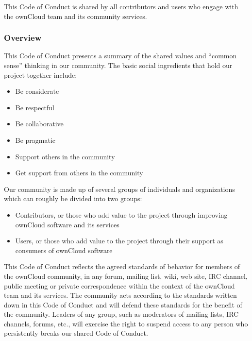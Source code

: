 \documentclass[letterpaper,10pt,english]{sphinxmanual}
\begin{document}
This Code of Conduct is shared by all contributors and users who engage with the ownCloud team and its community services.


\subsubsection{Overview}
\label{general/code-of-conduct:overview}
This Code of Conduct presents a summary of the shared values and “common sense” thinking in our community. The basic social ingredients that hold our project together include:
\begin{itemize}
\item {} 
Be considerate

\item {} 
Be respectful

\item {} 
Be collaborative

\item {} 
Be pragmatic

\item {} 
Support others in the community

\item {} 
Get support from others in the community

\end{itemize}

Our community is made up of several groups of individuals and organizations which can roughly be divided into two groups:
\begin{itemize}
\item {} 
Contributors, or those who add value to the project through improving ownCloud software and its services

\item {} 
Users, or those who add value to the project through their support as consumers of ownCloud software

\end{itemize}

This Code of Conduct reflects the agreed standards of behavior for members of the ownCloud community, in any forum, mailing list, wiki, web site, IRC channel, public meeting or private correspondence within the context of the ownCloud team and its services. The community acts according to the standards written down in this Code of Conduct and will defend these standards for the benefit of the community. Leaders of any group, such as moderators of mailing lists, IRC channels, forums, etc., will exercise the right to suspend access to any person who persistently breaks our shared Code of Conduct.
\end{document}
